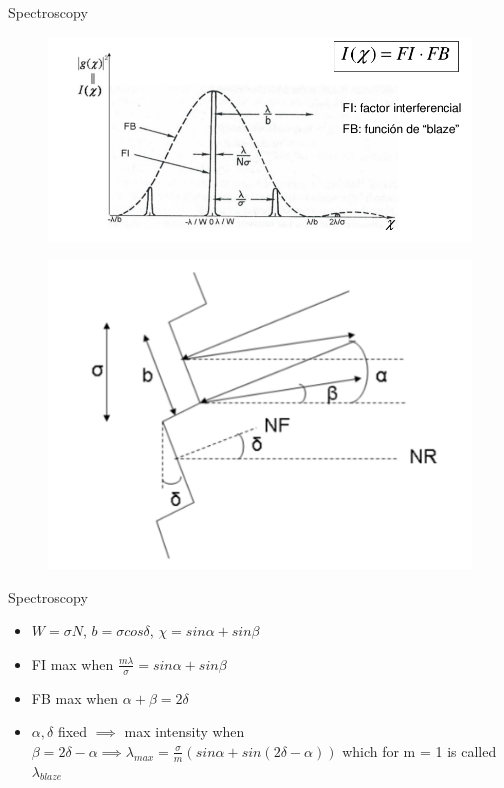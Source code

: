 \documentclass{beamer}
\begin{document}
\begin{frame}{Spectroscopy}
\begin{figure}[H]
 \centering
 \includegraphics[scale=0.25]{img7.png}
\end{figure}
\begin{figure}[H]
 \centering
 \includegraphics[scale=0.32]{img8.png}
\end{figure}

\end{frame}

\begin{frame}{Spectroscopy}
\begin{itemize}
\item $W = \sigma N$, $b = \sigma cos \delta$, $\chi = sin \alpha + sin \beta$
\item FI max when  $\frac{m \lambda}{\sigma} = sin \alpha + sin \beta$
\item FB max when $\alpha + \beta = 2 \delta$
\item $\alpha, \delta$ fixed $\implies $ max intensity when 
$\beta = 2 \delta - \alpha \implies \lambda_{max} = \frac{\sigma}{m}(sin \alpha + sin(2\delta - \alpha))$ 
which for m = 1 is called $\lambda_{blaze}$
\end{itemize}


\end{frame}
\end{document}
